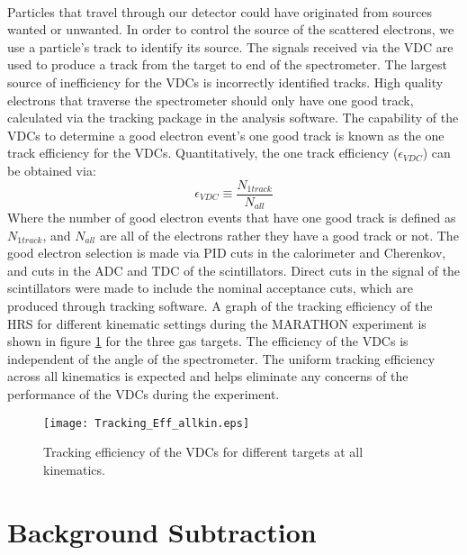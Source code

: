 \paragraph{}Particles that travel through our detector could have originated from sources wanted or unwanted. In order to control the source of the scattered electrons, we use a particle's track to identify its source. The signals received via the VDC are used to produce a track from the target to end of the spectrometer. The largest source of inefficiency for the VDCs is incorrectly identified tracks. High quality electrons that traverse the spectrometer should only have one good track, calculated via the tracking package in the analysis software. The capability of the VDCs to determine a good electron event's one good track is known as the one track efficiency for the VDCs. Quantitatively, the one track efficiency ($\epsilon_{VDC}$) can be obtained via:
\begin{equation}
\epsilon_{VDC} \equiv \frac{N_{1 track} }{N_{all}}
\end{equation}
Where the number of good electron events that have one good track is defined as $N_{1 track}$, and $N_{all}$ are all of the electrons rather they have a good track or not. The good electron selection is made via PID cuts in the calorimeter and Cherenkov, and cuts in the ADC and TDC of the scintillators. Direct cuts in the signal of the scintillators were made to include the nominal acceptance cuts, which are produced through tracking software. A graph of the tracking efficiency of the HRS for different kinematic settings during the MARATHON experiment is shown in figure \ref{trackeff} for the three gas targets. The efficiency of the VDCs is independent of the angle of the spectrometer. The uniform tracking efficiency across all kinematics is expected and helps eliminate any concerns of the performance of the VDCs during the experiment. 
\begin{figure}[t]
	\centering
	\texttt{[image: Tracking\_Eff\_allkin.eps]}
	\caption{Tracking efficiency of the VDCs for different targets at all kinematics. }
	\label{trackeff}
\end{figure}


\section{Background Subtraction}\label{sec:BG}
